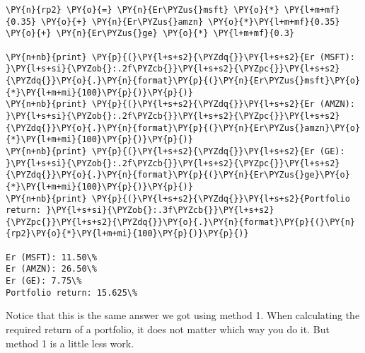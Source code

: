 \begin{Answer}
\begin{tcolorbox}[breakable, size=fbox, boxrule=1pt, pad at break*=1mm,colback=cellbackground, colframe=cellborder]
\begin{Verbatim}[commandchars=\\\{\}]
\PY{n}{rp2} \PY{o}{=} \PY{n}{Er\PYZus{}msft} \PY{o}{*} \PY{l+m+mf}{0.35} \PY{o}{+} \PY{n}{Er\PYZus{}amzn} \PY{o}{*}\PY{l+m+mf}{0.35} \PY{o}{+} \PY{n}{Er\PYZus{}ge} \PY{o}{*} \PY{l+m+mf}{0.3}
	
\PY{n+nb}{print} \PY{p}{(}\PY{l+s+s2}{\PYZdq{}}\PY{l+s+s2}{Er (MSFT): }\PY{l+s+si}{\PYZob{}:.2f\PYZcb{}}\PY{l+s+s2}{\PYZpc{}}\PY{l+s+s2}{\PYZdq{}}\PY{o}{.}\PY{n}{format}\PY{p}{(}\PY{n}{Er\PYZus{}msft}\PY{o}{*}\PY{l+m+mi}{100}\PY{p}{)}\PY{p}{)}
\PY{n+nb}{print} \PY{p}{(}\PY{l+s+s2}{\PYZdq{}}\PY{l+s+s2}{Er (AMZN): }\PY{l+s+si}{\PYZob{}:.2f\PYZcb{}}\PY{l+s+s2}{\PYZpc{}}\PY{l+s+s2}{\PYZdq{}}\PY{o}{.}\PY{n}{format}\PY{p}{(}\PY{n}{Er\PYZus{}amzn}\PY{o}{*}\PY{l+m+mi}{100}\PY{p}{)}\PY{p}{)}
\PY{n+nb}{print} \PY{p}{(}\PY{l+s+s2}{\PYZdq{}}\PY{l+s+s2}{Er (GE): }\PY{l+s+si}{\PYZob{}:.2f\PYZcb{}}\PY{l+s+s2}{\PYZpc{}}\PY{l+s+s2}{\PYZdq{}}\PY{o}{.}\PY{n}{format}\PY{p}{(}\PY{n}{Er\PYZus{}ge}\PY{o}{*}\PY{l+m+mi}{100}\PY{p}{)}\PY{p}{)}
\PY{n+nb}{print} \PY{p}{(}\PY{l+s+s2}{\PYZdq{}}\PY{l+s+s2}{Portfolio return: }\PY{l+s+si}{\PYZob{}:.3f\PYZcb{}}\PY{l+s+s2}{\PYZpc{}}\PY{l+s+s2}{\PYZdq{}}\PY{o}{.}\PY{n}{format}\PY{p}{(}\PY{n}{rp2}\PY{o}{*}\PY{l+m+mi}{100}\PY{p}{)}\PY{p}{)}

Er (MSFT): 11.50\%
Er (AMZN): 26.50\%
Er (GE): 7.75\%
Portfolio return: 15.625\%
\end{Verbatim}
\end{tcolorbox}

Notice that this is the same answer we got using method 1. When
calculating the required return of a portfolio, it does not matter which
way you do it. But method 1 is a little less work.
\end{Answer}	

